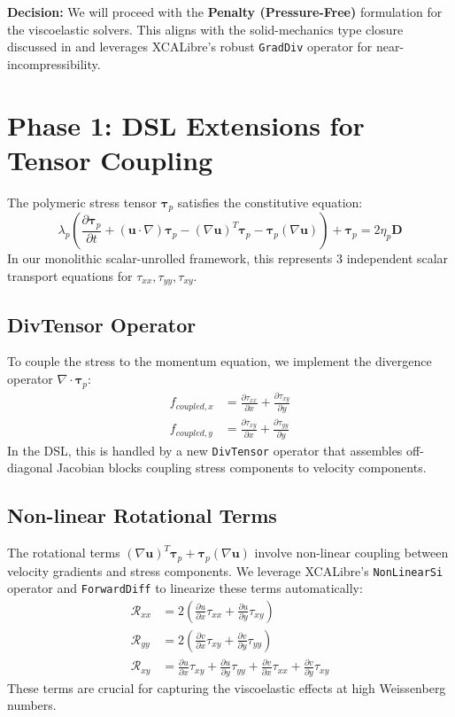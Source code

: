 \textbf{Decision:} We will proceed with the \textbf{Penalty (Pressure-Free)} formulation for the viscoelastic solvers. This aligns with the solid-mechanics type closure discussed in \cite{Boon2022} and leverages XCALibre's robust \texttt{GradDiv} operator for near-incompressibility.

\section{Phase 1: DSL Extensions for Tensor Coupling}
The polymeric stress tensor $\boldsymbol{\tau}_p$ satisfies the constitutive equation:
\begin{equation}
    \lambda_p \left( \frac{\partial \boldsymbol{\tau}_p}{\partial t} + (\mathbf{u} \cdot \nabla) \boldsymbol{\tau}_p - (\nabla \mathbf{u})^T \boldsymbol{\tau}_p - \boldsymbol{\tau}_p (\nabla \mathbf{u}) \right) + \boldsymbol{\tau}_p = 2 \eta_p \mathbf{D}
\end{equation}
In our monolithic scalar-unrolled framework, this represents 3 independent scalar transport equations for $\tau_{xx}, \tau_{yy}, \tau_{xy}$.

\subsection{DivTensor Operator}
To couple the stress to the momentum equation, we implement the divergence operator $\nabla \cdot \boldsymbol{\tau}_p$:
\begin{align}
    f_{coupled, x} &= \frac{\partial \tau_{xx}}{\partial x} + \frac{\partial \tau_{xy}}{\partial y} \\
    f_{coupled, y} &= \frac{\partial \tau_{xy}}{\partial x} + \frac{\partial \tau_{yy}}{\partial y}
\end{align}
In the DSL, this is handled by a new \texttt{DivTensor} operator that assembles off-diagonal Jacobian blocks coupling stress components to velocity components.

\subsection{Non-linear Rotational Terms}
The rotational terms $(\nabla \mathbf{u})^T \boldsymbol{\tau}_p + \boldsymbol{\tau}_p (\nabla \mathbf{u})$ involve non-linear coupling between velocity gradients and stress components. We leverage XCALibre's \texttt{NonLinearSi} operator and \texttt{ForwardDiff} to linearize these terms automatically:
\begin{align}
    \mathcal{R}_{xx} &= 2 \left( \frac{\partial u}{\partial x} \tau_{xx} + \frac{\partial u}{\partial y} \tau_{xy} \right) \\
    \mathcal{R}_{yy} &= 2 \left( \frac{\partial v}{\partial x} \tau_{xy} + \frac{\partial v}{\partial y} \tau_{yy} \right) \\
    \mathcal{R}_{xy} &= \frac{\partial u}{\partial x} \tau_{xy} + \frac{\partial u}{\partial y} \tau_{yy} + \frac{\partial v}{\partial x} \tau_{xx} + \frac{\partial v}{\partial y} \tau_{xy}
\end{align}
These terms are crucial for capturing the viscoelastic effects at high Weissenberg numbers.

